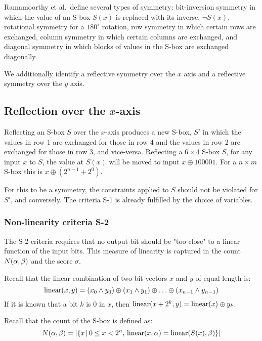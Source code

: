 Ramamoorthy et al.\ define several types of symmetry: 
bit-inversion symmetry in which the value of an S-box $S(x)$ is replaced with its inverse, $\lnot S(x)$,
rotational symmetry for a $180^{\circ}$ rotation,
row symmetry in which certain rows are exchanged,
column symmetry in which certain columns are exchanged,
and
diagonal symmetry in which blocks of values in the S-box are exchanged diagonally.

We additionally identify a reflective symmetry over the $x$ axis and a reflective symmetry over the $y$ axis.

\subsection{Reflection over the $x$-axis}

Reflecting an S-box $S$ over the $x$-axis produces a new S-box, $S'$ in which the values in row 1 are exchanged for those in row 4 and the values in row 2 are exchanged for those in row 3, and vice-versa.
Reflecting a $6 \times 4$ S-box $S$, for any input $x$ to $S$, the value at $S(x)$ will be moved to 
input $x \oplus 100001$. For a $n \times m$ S-box this is 
$x \oplus (2^{n-1} + 2^0)$.

For this to be a symmetry, the constraints applied to $S$ should not be violated for $S'$, and conversely.
The  criteria S-1 is already fulfilled by the choice of variables.

\subsubsection{Non-linearity criteria S-2}

The S-2 criteria requires that no output bit should be "too close" to a linear function of the input bits.
This measure of linearity is captured in the count $N(\alpha,\beta)$ and the score $\sigma$.

Recall that the linear combination of two bit-vectors $x$ and $y$ of equal length is:
\[\operatorname{linear}(x,y) = (x_0 \land y_0) \oplus (x_1 \land y_1) \oplus \ldots \oplus (x_{n-1} \land y_{n-1})\]
If it is known that a bit $k$ is $0$ in $x$, then $\operatorname{linear}(x + 2^{k},y) = \operatorname{linear}(x) \oplus y_k$.

Recall that the count of the S-box is defined as:
\[N(\alpha,\beta) = \lvert\left\{x\,\middle|\,0\leq x < 2^n,\,\operatorname{linear}(x,\alpha) = \operatorname{linear}(S(x),\beta)\right\}\rvert\] 

